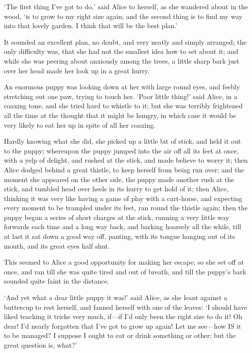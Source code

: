 \documentclass[12pt]{article}
\begin{document}
\begin{Parallel}[p]{}{}
{‘The first thing I’ve got to do,’ said Alice to herself, as she wandered about in the wood, ‘is to grow to my right size again; and the second thing is to find my way into that lovely garden. I think that will be the best plan.’

It sounded an excellent plan, no doubt, and very neatly and simply arranged; the only difficulty was, that she had not the smallest idea how to set about it; and while she was peering about anxiously among the trees, a little sharp bark just over her head made her look up in a great hurry.

An enormous puppy was looking down at her with large round eyes, and feebly stretching out one paw, trying to touch her. ‘Poor little thing!’ said Alice, in a coaxing tone, and she tried hard to whistle to it; but she was terribly frightened all the time at the thought that it might be hungry, in which case it would be very likely to eat her up in spite of all her coaxing.

Hardly knowing what she did, she picked up a little bit of stick, and held it out to the puppy; whereupon the puppy jumped into the air off all its feet at once, with a yelp of delight, and rushed at the stick, and made believe to worry it; then Alice dodged behind a great thistle, to keep herself from being run over; and the moment she appeared on the other side, the puppy made another rush at the stick, and tumbled head over heels in its hurry to get hold of it; then Alice, thinking it was very like having a game of play with a cart-horse, and expecting every moment to be trampled under its feet, ran round the thistle again; then the puppy began a series of short charges at the stick, running a very little way forwards each time and a long way back, and barking hoarsely all the while, till at last it sat down a good way off, panting, with its tongue hanging out of its mouth, and its great eyes half shut.

This seemed to Alice a good opportunity for making her escape; so she set off at once, and ran till she was quite tired and out of breath, and till the puppy’s bark sounded quite faint in the distance.

‘And yet what a dear little puppy it was!’ said Alice, as she leant against a buttercup to rest herself, and fanned herself with one of the leaves: ‘I should have liked teaching it tricks very much, if—if I’d only been the right size to do it! Oh dear! I’d nearly forgotten that I’ve got to grow up again! Let me see—how IS it to be managed? I suppose I ought to eat or drink something or other; but the great question is, what?’

}
\end{Parallel}
\end{document}
